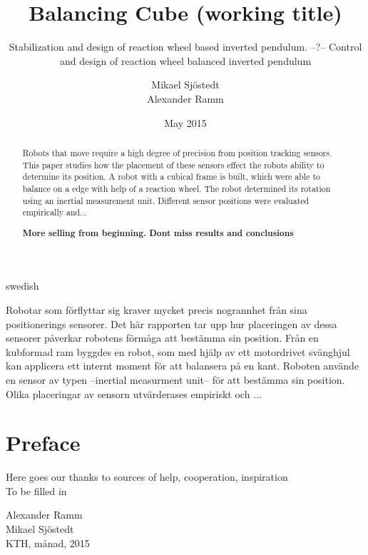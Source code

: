\documentclass[a4paper,11pt]{kth-mag}
\title{Balancing Cube (working title)}
\subtitle{Stabilization and design of reaction wheel based inverted pendulum. --?-- Control and design of reaction wheel balanced inverted pendulum}
\author{Mikael Sjöstedt \\ Alexander Ramm}
\date{May 2015}
\begin{document}

\clearpage

\frontmatter
\pagestyle{plain}
{}
\maketitle
{}
\begin{abstract}
Robots that move require a high degree of precision from position tracking sensors. This paper studies how the 
placement of these sensors effect the robots ability to determine its position. A robot with a cubical frame is
built, which were able to balance on a edge with help of a reaction wheel. The robot determined its rotation using an inertial measurement unit. Different sensor positions were evaluated empirically and...

\textbf{More selling from beginning. Dont miss results and conclusions}
 
\end{abstract}
\cleardoublepage
\begin{foreignabstract}{swedish}
Robotar som förflyttar sig kraver mycket precis nogrannhet från sina positionerings sensorer. Det här rapporten tar
upp hur placeringen av dessa sensorer påverkar robotens förmåga att bestämma sin position. Från en kubformad ram 
byggdes en robot, som med hjälp av ett motordrivet svänghjul kan applicera ett internt moment för att balansera på en kant. Roboten använde en sensor av typen --inertial measurment unit-- för att bestämma sin position. Olika placeringar av sensorn utvärderases empiriskt och ...
\\


\end{foreignabstract}
\clearpage
\chapter*{Preface}
Here goes our thanks to sources of  help, cooperation, inspiration \\ To be filled in \\
\begin{flushright}Alexander Ramm \\Mikael Sjöstedt \\ KTH, månad, 2015 \end{flushright}
\end{document}
